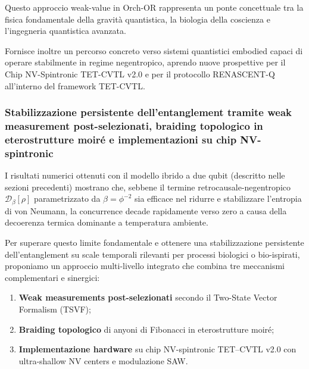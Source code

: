\documentclass[11pt,a4paper]{article}
\theoremstyle{plain}
\theoremstyle{definition}
\begin{document}
Questo approccio weak-value in Orch-OR rappresenta un ponte concettuale tra la fisica fondamentale della gravità quantistica, la biologia della coscienza e l’ingegneria quantistica avanzata. 


\vspace{0.3cm}


Fornisce inoltre un percorso concreto verso sistemi quantistici embodied capaci di operare stabilmente in regime negentropico, aprendo nuove prospettive per il Chip NV-Spintronic TET-CVTL v2.0 e per il protocollo RENASCENT-Q all’interno del framework TET-CVTL.


\clearpage


\subsubsection{Stabilizzazione persistente dell'entanglement tramite weak measurement post-selezionati, braiding topologico in eterostrutture moiré e implementazioni su chip NV-spintronic}
\label{sec:persistent_entanglement}


\vspace{0.2cm}

I risultati numerici ottenuti con il modello ibrido a due qubit (descritto nelle sezioni precedenti) mostrano che, sebbene il termine retrocausale-negentropico $\mathcal{D}_\beta[\rho]$ parametrizzato da $\beta = \phi^{-2}$ sia efficace nel ridurre e stabilizzare l'entropia di von Neumann, la concurrence decade rapidamente verso zero a causa della decoerenza termica dominante a temperatura ambiente. 


\vspace{0.3cm}


Per superare questo limite fondamentale e ottenere una stabilizzazione persistente dell'entanglement su scale temporali rilevanti per processi biologici o bio-ispirati, proponiamo un approccio multi-livello integrato che combina tre meccanismi complementari e sinergici:

\vspace{0.2cm}

\begin{enumerate}


\vspace{0.1cm}
    \item \textbf{Weak measurements post-selezionati} secondo il Two-State Vector Formalism (TSVF);

    \vspace{0.1cm}
    \item \textbf{Braiding topologico} di anyoni di Fibonacci in eterostrutture moiré;



    \vspace{0.1cm}
    \item \textbf{Implementazione hardware} su chip NV-spintronic TET–CVTL v2.0 con ultra-shallow NV centers e modulazione SAW.
\end{enumerate}
\end{document}

